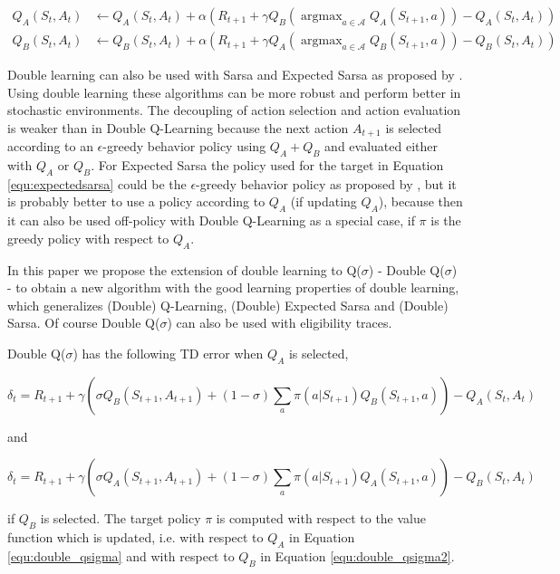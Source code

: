 \documentclass{article} %
\DeclareMathOperator*{\argmax}{argmax}
\begin{document}
\begin{align}
    Q_A(S_t, A_t) &\leftarrow Q_A(S_t, A_t) + \alpha (R_{t+1} + \gamma Q_B(\argmax_{a \in \mathcal{A}} Q_A(S_{t+1}, a)) - Q_A(S_t, A_t)) \\
    Q_B(S_t, A_t) &\leftarrow Q_B(S_t, A_t) + \alpha (R_{t+1} + \gamma Q_A(\argmax_{a \in \mathcal{A}} Q_B(S_{t+1}, a)) - Q_B(S_t, A_t))
\end{align}

Double learning can also be used with Sarsa and Expected Sarsa as proposed by \cite{ganger2016}. Using double learning these algorithms can be more robust and perform better in stochastic environments. The decoupling of action selection and action evaluation is weaker than in Double Q-Learning because the next action $A_{t+1}$ is selected according to an $\epsilon$-greedy behavior policy using $Q_A + Q_B$ and evaluated either with $Q_A$ or $Q_B$. For Expected Sarsa the policy used for the target in Equation \ref{equ:expectedsarsa} could be the $\epsilon$-greedy behavior policy as proposed by \cite{ganger2016}, but it is probably better to use a policy according to $Q_A$ (if updating $Q_A$), because then it can also be used off-policy with Double Q-Learning as a special case, if $\pi$ is the greedy policy with respect to $Q_A$.

In this paper we propose the extension of double learning to Q($\sigma$) - Double Q($\sigma$) - to obtain a new algorithm with the good learning properties of double learning, which generalizes (Double) Q-Learning, (Double) Expected Sarsa and (Double) Sarsa. Of course Double Q($\sigma$) can also be used with eligibility traces.

Double Q($\sigma$) has the following TD error when $Q_A$ is selected,

\begin{equation}
\delta_t = R_{t+1} + \gamma \left( \sigma Q_B(S_{t+1}, A_{t+1}) + (1 - \sigma) \sum_a \pi(a|S_{t+1}) Q_B(S_{t+1}, a) \right) - Q_A(S_t, A_t)
\label{equ:double_qsigma}
\end{equation}

and 

\begin{equation}
\delta_t = R_{t+1} + \gamma \left( \sigma Q_A(S_{t+1}, A_{t+1}) + (1 - \sigma) \sum_a \pi(a|S_{t+1}) Q_A(S_{t+1}, a) \right) - Q_B(S_t, A_t)
\label{equ:double_qsigma2}
\end{equation}

if $Q_B$ is selected. The target policy $\pi$ is computed with respect to the value function which is updated, i.e. with respect to $Q_A$ in Equation \ref{equ:double_qsigma} and with respect to $Q_B$ in Equation \ref{equ:double_qsigma2}.
\end{document}
